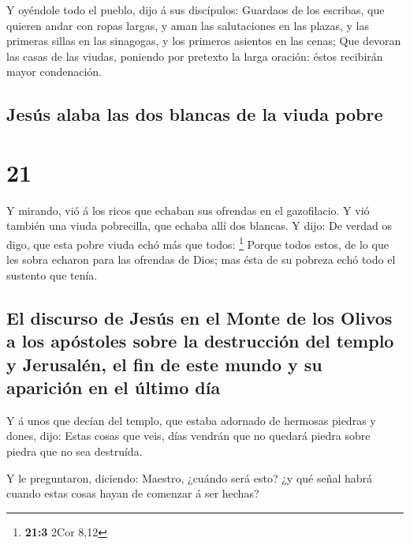 Y oyéndole todo el pueblo, dijo á sus discípulos:
 Guardaos de los escribas, que quieren andar con ropas
largas, y aman las salutaciones en las plazas, y las primeras sillas en
las sinagogas, y los primeros asientos en las cenas;  Que
devoran las casas de las viudas, poniendo por pretexto la larga oración:
éstos recibirán mayor condenación.

\hypertarget{jesuxfas-alaba-las-dos-blancas-de-la-viuda-pobre}{%
\subsection{Jesús alaba las dos blancas de la viuda
pobre}\label{jesuxfas-alaba-las-dos-blancas-de-la-viuda-pobre}}

\hypertarget{section-20}{%
\section{21}\label{section-20}}

 Y mirando, vió á los ricos que echaban sus ofrendas en el
gazofilacio.  Y vió también una viuda pobrecilla, que
echaba allí dos blancas.  Y dijo: De verdad os digo, que
esta pobre viuda echó más que todos: \footnote{\textbf{21:3} 2Cor 8,12}
 Porque todos estos, de lo que les sobra echaron para las
ofrendas de Dios; mas ésta de su pobreza echó todo el sustento que
tenía.

\hypertarget{el-discurso-de-jesuxfas-en-el-monte-de-los-olivos-a-los-apuxf3stoles-sobre-la-destrucciuxf3n-del-templo-y-jerusaluxe9n-el-fin-de-este-mundo-y-su-apariciuxf3n-en-el-uxfaltimo-duxeda}{%
\subsection{El discurso de Jesús en el Monte de los Olivos a los
apóstoles sobre la destrucción del templo y Jerusalén, el fin de este
mundo y su aparición en el último
día}\label{el-discurso-de-jesuxfas-en-el-monte-de-los-olivos-a-los-apuxf3stoles-sobre-la-destrucciuxf3n-del-templo-y-jerusaluxe9n-el-fin-de-este-mundo-y-su-apariciuxf3n-en-el-uxfaltimo-duxeda}}

 Y á unos que decían del templo, que estaba adornado de
hermosas piedras y dones, dijo:  Estas cosas que veis,
días vendrán que no quedará piedra sobre piedra que no sea destruída.

 Y le preguntaron, diciendo: Maestro, ¿cuándo será esto?
¿y qué señal habrá cuando estas cosas hayan de comenzar á ser hechas?

